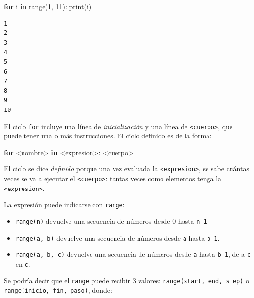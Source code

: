 \documentclass[
  letterpaper,
  DIV=11,
  numbers=noendperiod]{scrreprt}
\newenvironment{Shaded}{\begin{snugshade}}{\end{snugshade}}
\newcommand{\BuiltInTok}[1]{\textcolor[rgb]{0.00,0.23,0.31}{#1}}
\newcommand{\ControlFlowTok}[1]{\textcolor[rgb]{0.00,0.23,0.31}{\textbf{#1}}}
\newcommand{\DecValTok}[1]{\textcolor[rgb]{0.68,0.00,0.00}{#1}}
\newcommand{\KeywordTok}[1]{\textcolor[rgb]{0.00,0.23,0.31}{\textbf{#1}}}
\newcommand{\NormalTok}[1]{\textcolor[rgb]{0.00,0.23,0.31}{#1}}
\newcommand{\OperatorTok}[1]{\textcolor[rgb]{0.37,0.37,0.37}{#1}}
\providecommand{\tightlist}{%
  \setlength{\itemsep}{0pt}\setlength{\parskip}{0pt}}\usepackage{longtable,booktabs,array}
\begin{document}
\begin{Shaded}
\begin{Highlighting}[]
\ControlFlowTok{for}\NormalTok{ i }\KeywordTok{in} \BuiltInTok{range}\NormalTok{(}\DecValTok{1}\NormalTok{, }\DecValTok{11}\NormalTok{):}
    \BuiltInTok{print}\NormalTok{(i)}
\end{Highlighting}
\end{Shaded}

\begin{verbatim}
1
2
3
4
5
6
7
8
9
10
\end{verbatim}

El ciclo \texttt{for} incluye una línea de \emph{inicialización} y una
línea de \texttt{\textless{}cuerpo\textgreater{}}, que puede tener una o
más instrucciones. El ciclo definido es de la forma:

\begin{Shaded}
\begin{Highlighting}[]
\ControlFlowTok{for} \OperatorTok{\textless{}}\NormalTok{nombre}\OperatorTok{\textgreater{}} \KeywordTok{in} \OperatorTok{\textless{}}\NormalTok{expresion}\OperatorTok{\textgreater{}}\NormalTok{:}
    \OperatorTok{\textless{}}\NormalTok{cuerpo}\OperatorTok{\textgreater{}}
\end{Highlighting}
\end{Shaded}

El ciclo se dice \emph{definido} porque una vez evaluada la
\texttt{\textless{}expresion\textgreater{}}, se sabe cuántas veces se va
a ejecutar el \texttt{\textless{}cuerpo\textgreater{}}: tantas veces
como elementos tenga la \texttt{\textless{}expresion\textgreater{}}.

La expresión puede indicarse con \texttt{range}:

\begin{itemize}
\tightlist
\item
  \texttt{range(n)} devuelve una secuencia de números desde 0 hasta
  \texttt{n-1}.
\item
  \texttt{range(a,\ b)} devuelve una secuencia de números desde
  \texttt{a} hasta \texttt{b-1}.
\item
  \texttt{range(a,\ b,\ c)} devuelve una secuencia de números desde
  \texttt{a} hasta \texttt{b-1}, de a \texttt{c} en \texttt{c}.
\end{itemize}

Se podría decir que el \texttt{range} puede recibir 3 valores:
\texttt{range(start,\ end,\ step)} o
\texttt{range(inicio,\ fin,\ paso)}, donde:
\end{document}
